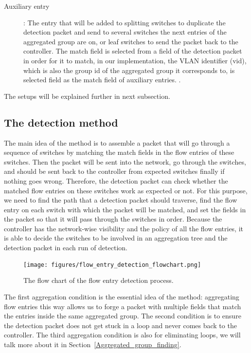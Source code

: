 \begin{description}
\item 
[Auxiliary entry]:
The entry that will be added to splitting switches to duplicate the detection packet and send to several \sout{} switches the next entries of the aggregated group are on, or leaf switches to send the packet back to the controller. The match field is selected from a field of the detection packet in order for it to match, in our implementation, the VLAN identifier (vid), which is also the group id of the aggregated group it corresponds to, is selected field as the match field of auxiliary entries. \sout{}.
\end{description}

The setups will be explained further in next subsection.

\subsection{The detection method}
\label{Detection_method}

The main idea of the method is to assemble a packet that will go through a sequence of switches by matching the match fields in the flow entries of these switches. Then the packet will be sent into the network, go through the switches, and should be sent back to the controller from expected switches finally if nothing goes wrong. Therefore, the detection packet can check whether the matched flow entries on these switches work as expected or not. For this purpose, we need to find the path that a detection packet should traverse, find the flow entry on each switch with which the packet will be matched, and set the fields in the packet so that it will pass through the switches in order. Because the controller has the network-wise visibility and the policy of all the flow entries, it is able to decide the switches to be involved in an aggregation tree and the detection packet in each run of detection. 

\begin{figure}[H]
\begin{center} 
\texttt{[image: figures/flow\_entry\_detection\_flowchart.png]}
\end{center}
\caption{The flow chart of the flow entry detection process.}
\label{flow_entry_detection_flowchart}
\end{figure}

The first aggregation condition is the essential idea of the method: aggregating flow entries this way allows us to forge a packet with multiple fields that match the entries inside the same aggregated group. The second condition is to ensure the detection packet does not get stuck in a loop and never comes back to the controller. The third aggregation condition is also for eliminating loops, we will talk more about it in Section~\ref{Aggregated_group_finding}.


